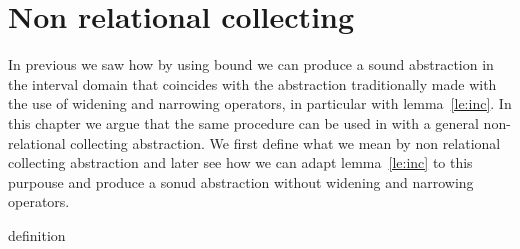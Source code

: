 \chapter{Non relational collecting}

In previous we saw how by using bound we can produce a sound
abstraction in the interval domain that coincides with the abstraction
traditionally made with the use of widening and narrowing operators,
in particular with lemma~\ref{le:inc}. In this chapter we argue that
the same procedure can be used in with a general non-relational
collecting abstraction. We first define what we mean by non relational
collecting abstraction and later see how we can adapt
lemma~\ref{le:inc} to this purpouse and produce a sonud abstraction
without widening and narrowing operators.

{definition}
